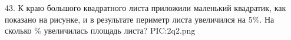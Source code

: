 43. К краю большого квадратного листа приложили маленький квадратик, как показано на рисунке, и в результате периметр листа увеличился на $5\%.$ На сколько $\%$ увеличилась площадь листа?
{{PIC:2q2.png}}\\
